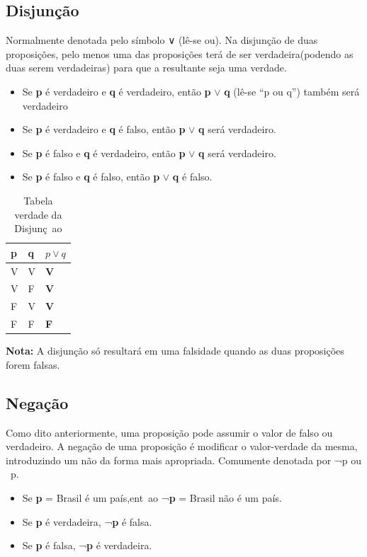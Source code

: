 \documentclass[a4paper,12pt,twoside,BCOR=10mm]{scrbook}
\begin{document}
\begin{titlepage}
\subsection{Disjunção}
Normalmente denotada pelo símbolo ∨  (lê-se ou). Na disjunção de duas proposições, pelo menos uma das proposições terá de ser verdadeira(podendo as duas serem verdadeiras) para que a resultante seja uma verdade.
\begin{itemize}
\item Se \textbf{p} é verdadeiro e \textbf{q} é verdadeiro, então \textbf{p} $\vee$ \textbf{q} (lê-se “p ou q”) também será verdadeiro
\item Se \textbf{p} é verdadeiro e \textbf{q} é falso, então \textbf{p} $\vee$ \textbf{q} será verdadeiro.
\item Se \textbf{p} é falso e \textbf{q} é verdadeiro, então \textbf{p} $\vee$ \textbf{q} será verdadeiro.
\item Se \textbf{p} é falso e \textbf{q} é falso, então \textbf{p} $\vee$ \textbf{q} é falso.
\end{itemize}


\begin{table}[htb]
\centering
\caption{Tabela verdade da Disjunç~ao}
     \sffamily \begin{tabularx}{1.0\textwidth}{ p{5cm}  p{5cm}  p{5cm} }
    \hline
   \textbf{p} \hfill & \textbf{q} \hfill & {$p \vee q$} \\ \hline
    V & V & \textbf{V}\\
    V & F & \textbf{V}\\
    F & V & \textbf{V}\\
    F & F & \textbf{F}\\ \hline
    \end{tabularx} \normalfont
\label{table:Emissivity}
\end{table}
\textbf{Nota:} A disjunção só resultará em uma falsidade quando as duas proposições forem falsas.

\subsection{Negação}
Como dito anteriormente, uma proposição pode assumir o valor de falso ou verdadeiro. A negação de uma proposição é modificar o valor-verdade da mesma, introduzindo um não da forma mais apropriada. Comumente denotada por ¬p ou ~p.

\begin{itemize}
\item Se \textbf{p} = Brasil é um país,ent~ao ¬\textbf{p} = Brasil não é um país.
\item Se \textbf{p} é verdadeira, ¬\textbf{p} é falsa.
\item Se \textbf{p} é falsa,  ¬\textbf{p} é verdadeira.
\end{itemize}



\end{titlepage}
\end{document}
